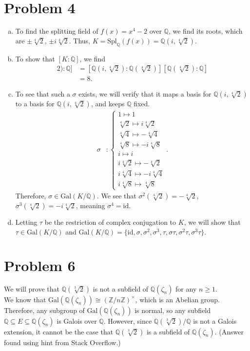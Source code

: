 \documentclass[10pt]{extarticle}
\newcommand{\Q}{\mathbb{Q}}
\newcommand{\Z}{\mathbb{Z}}
\begin{document}
  \section{Problem 4}%
  \begin{enumerate}[(a)]
    \item To find the splitting field of $f(x) = x^4 - 2$ over $\Q$, we find its roots, which are $\pm \sqrt[4]{2}$, $\pm i\sqrt[4]{2}$. Thus, $ K = \text{Spl}_{\Q}(f(x)) = \Q(i,\sqrt[4]{2})$.
    \item To show that $[K:\Q]$, we find
      \begin{align*}
        [\Q(i,\sqrt[4]{2}) : \Q] &= [\Q(i,\sqrt[4]{2}):\Q(\sqrt[4]{2})][\Q(\sqrt[4]{2}):\Q]\\
                                 &= 8.
      \end{align*}
    \item To see that such a $\sigma$ exists, we will verify that it maps a basis for $\Q(i,\sqrt[4]{2})$ to a basis for $\Q(i,\sqrt[4]{2})$, and keeps $\Q$ fixed.
      \begin{align*}
        \sigma &: \begin{cases}
                    1 \mapsto 1\\
                    \sqrt[4]{2} \mapsto i\sqrt[4]{2}\\
                    \sqrt[4]{4} \mapsto -\sqrt[4]{4}\\
                    \sqrt[4]{8} \mapsto -i\sqrt[4]{8}\\
                    i \mapsto i\\
                    i\sqrt[4]{2} \mapsto -\sqrt[4]{2}\\
                    i\sqrt[4]{4} \mapsto -i\sqrt[4]{4}\\
                    i\sqrt[4]{8} \mapsto \sqrt[4]{8}
                  \end{cases}.
      \end{align*}
      Therefore, $\sigma \in \text{Gal}(K/\Q)$. We see that $\sigma^{2}(\sqrt[4]{2}) = -\sqrt[4]{2}$, $\sigma^3(\sqrt[4]{2}) = -i\sqrt[4]{2}$, meaning $\sigma^{4} = \text{id}$.
    \item Letting $\tau$ be the restriction of complex conjugation to $K$, we will show that $\tau\in \text{Gal}(K/\Q)$ and $\text{Gal}(K/\Q) = \{\text{id},\sigma,\sigma^2,\sigma^3,\tau,\sigma\tau,\sigma^2\tau,\sigma^3\tau\}$.
  \end{enumerate}
  \section{Problem 6}%
  We will prove that $\Q(\sqrt[3]{2})$ is not a subfield of $\Q(\zeta_n)$ for any $n\geq 1$.\\

  We know that $\text{Gal}(\Q(\zeta_n))\cong \left(\Z/n\Z\right)^{\times}$, which is an Abelian group. Therefore, any subgroup of $\text{Gal}\left(\Q(\zeta_n)\right)$ is normal, so any subfield $\Q \subseteq E\subseteq \Q(\zeta_n)$ is Galois over $\Q$. However, since $\Q(\sqrt[3]{2})/\Q$ is not a Galois extension, it cannot be the case that $\Q(\sqrt[3]{2})$ is a subfield of $\Q(\zeta_n)$. (Answer found using hint from Stack Overflow.)
\end{document}
